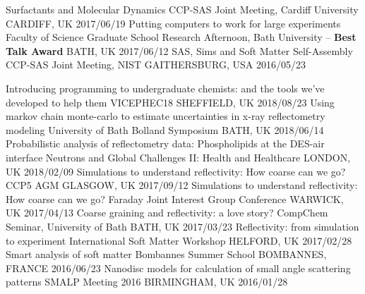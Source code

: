 \begin{cvhonors}
  \cvhonor
    {Surfactants and Molecular Dynamics}
    {CCP-SAS Joint Meeting, Cardiff University}
    {CARDIFF, UK}
    {2017/06/19}
  \cvhonor
  	{Putting computers to work for large experiments}
    {Faculty of Science Graduate School Research Afternoon, Bath University -- \textbf{Best Talk Award}}
    {BATH, UK}
    {2017/06/12}
  \cvhonor
    {SAS, Sims and Soft Matter Self-Assembly}
    {CCP-SAS Joint Meeting, NIST}
    {GAITHERSBURG, USA}
    {2016/05/23}
\end{cvhonors}

\begin{cvhonors}
  \cvhonor
    {Introducing programming to undergraduate chemists: and the tools we've developed to help them}
    {VICEPHEC18}
    {SHEFFIELD, UK}
    {2018/08/23}
  \cvhonor
    {Using markov chain monte-carlo to estimate uncertainties in x-ray reflectometry modeling}
    {University of Bath Bolland Symposium}
    {BATH, UK}
    {2018/06/14}
  \cvhonor
    {Probabilistic analysis of reflectometry data: Phospholipids at the DES-air interface}
    {Neutrons and Global Challenges II: Health and Healthcare}
    {LONDON, UK}
    {2018/02/09}
  \cvhonor
    {Simulations to understand reflectivity: How coarse can we go?}
    {CCP5 AGM}
    {GLASGOW, UK}
    {2017/09/12}
  \cvhonor
  	{Simulations to understand reflectivity: How coarse can we go?}
    {Faraday Joint Interest Group Conference}
    {WARWICK, UK}
    {2017/04/13}
  \cvhonor
  	{Coarse graining and reflectivity: a love story?}
    {CompChem Seminar, University of Bath}
    {BATH, UK}
    {2017/03/23}
  \cvhonor
  	{Reflectivity: from simulation to experiment}
    {International Soft Matter Workshop}
    {HELFORD, UK}
    {2017/02/28}
  \cvhonor
    {Smart analysis of soft matter}
    {Bombannes Summer School}
    {BOMBANNES, FRANCE}
    {2016/06/23}
  \cvhonor
    {Nanodisc models for calculation of small angle scattering patterns}
    {SMALP Meeting 2016}
    {BIRMINGHAM, UK}
    {2016/01/28}
\end{cvhonors}

